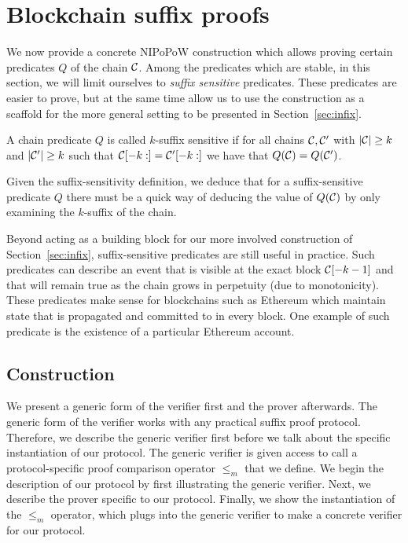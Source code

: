\section{Blockchain suffix proofs}

We now provide a concrete NIPoPoW construction which allows proving certain
predicates $Q$ of the chain $\mathcal{C}$.  
Among the predicates which are stable, in this section, we will limit ourselves to \textit{suffix
sensitive} predicates. These predicates are easier to prove, but at the same
time allow us to use the construction as a scaffold for the more general setting to
be presented  in Section~\ref{sec:infix}.
%


\begin{definition}
A chain predicate $Q$ is called $k$-\textnormal{suffix sensitive} if for all
chains $\mathcal{C}, \mathcal{C}'$ with $|\mathcal{C}| \geq k$ and $|\mathcal{C}'| \geq k$ such that
$\mathcal{C}[-k:] = \mathcal{C}'[-k:]$ we have that $Q(\mathcal{C}) = Q(\mathcal{C}')$.
\end{definition}

Given the suffix-sensitivity definition, we deduce that for a suffix-sensitive
predicate $Q$ there must be a quick way of deducing the value of $Q(\mathcal{C})$ by
only examining the $k$-suffix of the chain.

Beyond acting as a building block for our more involved construction of  Section~\ref{sec:infix}, 
suffix-sensitive predicates are still useful in practice. Such 
predicates can describe an event that is visible at the exact block
$\mathcal{C}[-k-1]$ and that will remain true as the chain grows in perpetuity (due
to monotonicity). These predicates make sense for blockchains such as Ethereum
which maintain state \cite{vitalik} that is propagated and committed to in every
block. One example of such predicate is the existence of a particular Ethereum 
account.

\subsection{Construction}

We present a generic form of the verifier first and the prover afterwards. The
generic form of the verifier works with any practical suffix proof protocol.
Therefore, we describe the generic verifier first before we talk about the
specific instantiation of our protocol. The generic verifier is given access to
call a protocol-specific proof comparison operator $\leq_m$ that we define. We begin the
description of our protocol by first illustrating the generic verifier. Next, we
describe the prover specific to our protocol. Finally, we show the instantiation
of the $\leq_m$ operator, which plugs into the generic verifier to make a
concrete verifier for our protocol.

